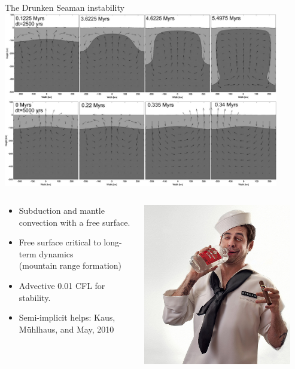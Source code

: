 \begin{frame}[shrink=5]{The Drunken Seaman instability}
  \includegraphics[width=0.9\textwidth]{figures/DrunkenSeaman} \\
  \begin{columns}
    \begin{column}{0.8\textwidth}
      \begin{itemize}
      \item Subduction and mantle convection with a free surface.
      \item Free surface critical to long-term dynamics \\
        (\eg mountain range formation)
      \item Advective 0.01 CFL for stability.
      \item Semi-implicit helps: Kaus, M\"uhlhaus, and May, 2010
      \end{itemize}
    \end{column}
    \begin{column}{0.2\textwidth}
      \includegraphics[width=0.9\textwidth]{figures/DrunkenSeamanBottle}
    \end{column}
  \end{columns}
\end{frame}
